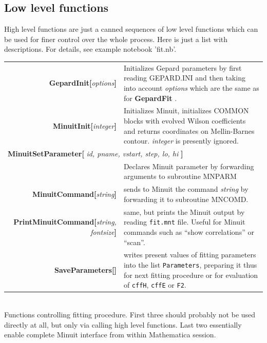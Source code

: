 \documentclass[12pt]{article}
\newcommand{\defboxitem}[3]{ {\ttfamily \bfseries #1[}\emph{#2}{\ttfamily \bfseries ]} & #3 }
\newcommand{\mmacomm}[1]{ {\ttfamily \bfseries #1} }
\begin{document}
\subsection{Low level functions}

High level functions are just a canned sequences of low level functions which can
be used for finer control over the whole process. Here is just a list with
descriptions. For details, see example notebook 'fit.nb'.


\begin{flushleft}
\colorbox{defbox}{%
\begin{minipage}{\textwidth}%
\begin{tabular}{rp{8cm}}%
\defboxitem{GepardInit}{options}{Initializes Gepard parameters by first reading GEPARD.INI
and then taking into account \emph{options} which are the same as for 
\mmacomm{GepardFit}. } \\[0.8ex]
\defboxitem{MinuitInit}{integer}{Initializes Minuit, initializes COMMON blocks with evolved
Wilson coefficients and returns coordinates on Mellin-Barnes contour. \emph{integer} is
presently ignored.} \\[0.8ex]
\multicolumn{2}{l}{\mmacomm{MinuitSetParameter[}\emph{id, pname, vstart, step, lo, hi}
\mmacomm{]} } \\
 & Declares Minuit parameter by forwarding arguments to subroutine MNPARM \\[0.8ex]
\defboxitem{MinuitCommand}{string}{sends to Minuit the command \emph{string} by
forwarding it to subroutine MNCOMD. } \\[0.8ex]
\defboxitem{PrintMinuitCommand}{string, fontsize}{same, but prints the Minuit output
by reading \texttt{fit.mnt} file. Useful for Minuit commands such as
``show correlations'' or ``scan''.} \\
\defboxitem{SaveParameters}{}{writes present values of fitting
parameters into the list \texttt{Parameters}, preparing it thus for next fitting procedure or
for evaluation of \texttt{cffH}, \texttt{cffE} or \texttt{F2}.}
\end{tabular}%
\end{minipage}}\\[0.5ex]
{\small Functions controlling fitting procedure. First three should probably not be
used directly at all, but only via calling high level functions. Last two essentially
enable complete Minuit interface from within Mathematica session.}
\end{flushleft}
\end{document}
